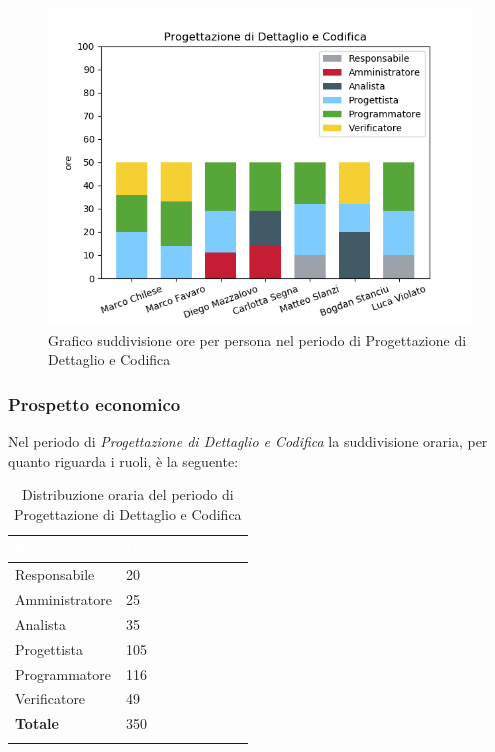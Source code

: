 \begin{figure}[H]
	\centering
	\includegraphics[width=0.8\linewidth]{./images/fig_pdc.png}
	\caption{Grafico suddivisione ore per persona nel periodo di Progettazione di Dettaglio e Codifica}
	\label{fig:grafico suddivione ruoli periodo pdc}
\end{figure}

\subsubsection{Prospetto economico}

Nel periodo di \textit{Progettazione di Dettaglio e Codifica} la suddivisione oraria, per quanto riguarda i ruoli, è la seguente: 

\begin{longtable}{| C{.30\textwidth}| C{.15\textwidth}| C{.20\textwidth}|}
	\hline
	\textbf{\textcolor{white}{Ruolo}} & \textbf{\textcolor{white}{Ore}} & \textbf{\textcolor{white}{Costo in \euro}} \\
	\hline 
	Responsabile & 20 &  \\
	\hline
	Amministratore & 25 & \\
	\hline
	Analista & 35 &  \\
	\hline
	Progettista & 105 &  \\
	\hline
	Programmatore & 116 &  \\
	\hline
	Verificatore & 49 &  \\
	\hline
	\textbf{Totale} & 350 & \\ 
	\hline
	
	\caption{Distribuzione oraria del periodo di Progettazione di Dettaglio e Codifica}
	\label{Distribuzione oraria dei ruoli pdc}
\end{longtable}

